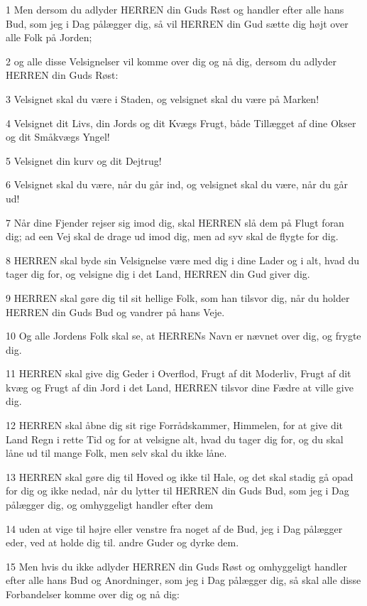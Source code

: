 \par 1 Men dersom du adlyder HERREN din Guds Røst og handler efter alle hans Bud, som jeg i Dag pålægger dig, så vil HERREN din Gud sætte dig højt over alle Folk på Jorden;
\par 2 og alle disse Velsignelser vil komme over dig og nå dig, dersom du adlyder HERREN din Guds Røst:
\par 3 Velsignet skal du være i Staden, og velsignet skal du være på Marken!
\par 4 Velsignet dit Livs, din Jords og dit Kvægs Frugt, både Tillægget af dine Okser og dit Småkvægs Yngel!
\par 5 Velsignet din kurv og dit Dejtrug!
\par 6 Velsignet skal du være, når du går ind, og velsignet skal du være, når du går ud!
\par 7 Når dine Fjender rejser sig imod dig, skal HERREN slå dem på Flugt foran dig; ad een Vej skal de drage ud imod dig, men ad syv skal de flygte for dig.
\par 8 HERREN skal byde sin Velsignelse være med dig i dine Lader og i alt, hvad du tager dig for, og velsigne dig i det Land, HERREN din Gud giver dig.
\par 9 HERREN skal gøre dig til sit hellige Folk, som han tilsvor dig, når du holder HERREN din Guds Bud og vandrer på hans Veje.
\par 10 Og alle Jordens Folk skal se, at HERRENs Navn er nævnet over dig, og frygte dig.
\par 11 HERREN skal give dig Geder i Overflod, Frugt af dit Moderliv, Frugt af dit kvæg og Frugt af din Jord i det Land, HERREN tilsvor dine Fædre at ville give dig.
\par 12 HERREN skal åbne dig sit rige Forrådskammer, Himmelen, for at give dit Land Regn i rette Tid og for at velsigne alt, hvad du tager dig for, og du skal låne ud til mange Folk, men selv skal du ikke låne.
\par 13 HERREN skal gøre dig til Hoved og ikke til Hale, og det skal stadig gå opad for dig og ikke nedad, når du lytter til HERREN din Guds Bud, som jeg i Dag pålægger dig, og omhyggeligt handler efter dem
\par 14 uden at vige til højre eller venstre fra noget af de Bud, jeg i Dag pålægger eder, ved at holde dig til. andre Guder og dyrke dem.
\par 15 Men hvis du ikke adlyder HERREN din Guds Røst og omhyggeligt handler efter alle hans Bud og Anordninger, som jeg i Dag pålægger dig, så skal alle disse Forbandelser komme over dig og nå dig:
